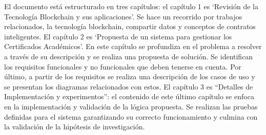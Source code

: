 El documento está estructurado en tres capítulos: el capítulo 1 es `Revisión de la Tecnología Blockchain y sus aplicaciones'. Se hace un recorrido por trabajos relacionados, la tecnología blockchain, compartir datos y conceptos de contratos inteligentes. El capítulo 2 es `Propuesta de un sistema para gestionar los Certificados Académicos'. En este capítulo se profundiza en el problema a resolver a través de su descripción y se realiza una propuesta de solución. Se identifican los requisitos funcionales y no funcionales que deben tenerse en cuenta. Por último, a partir de los requisitos se realiza una descripción de los casos de uso y se presentan los diagramas relacionados con estos. El capítulo 3 es ``Detalles de Implementación y experimentos'': el contenido de este último capítulo se enfoca en la implementación y validación de la lógica propuesta. Se realizan las pruebas definidas para el sistema garantizando su correcto funcionamiento y culmina con la validación de la hipótesis de investigación.








